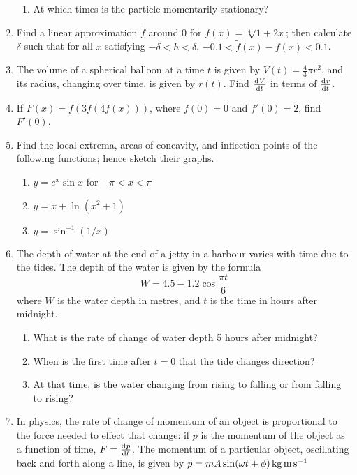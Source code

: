 \begin{enumerate}
\begin{enumerate}
      \item At which times is the particle momentarily stationary?
    \end{enumerate}
  \item Find a linear approximation $ \tilde f $ around 0 for $ f(x) = \sqrt[4]{1 + 2x} $; then calculate $ \delta $ such that
        for all $ x $ satisfying $ -\delta < h < \delta $, $ -0.1 < \tilde f(x) - f(x) < 0.1 $.
  \item The volume of a spherical balloon at a time $ t $ is given by $ V(t) = \frac{4}{3} \pi r^2 $, and its radius, changing
        over time, is given by $ r(t) $. Find $ \od{V}{t} $ in terms of $ \od{r}{t} $.
  \item If $ F(x) = f(3f(4f(x))) $, where $ f(0) = 0 $ and $ f'(0) = 2 $, find $ F'(0) $.
  \item Find the local extrema, areas of concavity, and inflection points of the following functions; hence sketch their graphs.
    \begin{enumerate}
      \item $ y = e^x \sin x $ for $ -\pi < x < \pi $
      \item $ y = x + \ln(x^2 + 1) $
      \item $ y = \sin^{-1} (1/x) $
    \end{enumerate}
  \item The depth of water at the end of a jetty in a harbour varies with time due to the tides. The depth
        of the water is given by the formula
        \begin{displaymath}
          W = 4.5 - 1.2 \cos \frac{\pi t}{6}
        \end{displaymath}
        where $ W $ is the water depth in metres, and $ t $ is the time in hours after midnight.
    \begin{enumerate}
      \item What is the rate of change of water depth 5 hours after midnight?
      \item When is the first time after $ t = 0 $ that the tide changes direction?
      \item At that time, is the water changing from rising to falling or from falling to rising?
    \end{enumerate}
  \item In physics, the rate of change of momentum of an object is proportional to the force needed to effect
        that change: if $ p $ is the momentum of the object as a function of time, $ F = \od{p}{t} $. The momentum
        of a particular object, oscillating back and forth along a line, is given by $ p = mA\sin(\omega t + \phi)\thinspace\si{\kilo\gram\metre\per\second} $

\end{enumerate}
